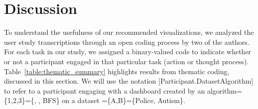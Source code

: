 \section{Discussion}
To understand the usefulness of our recommended visualizations, we analyzed the user study transcriptions through an open coding process by two of the authors. For each task in our study, we assigned a binary-valued code to indicate whether or not a participant engaged in that particular task (action or thought process). Table~\ref{table:thematic_summary} highlights results from thematic coding, discussed in this section. We will use the notation [Participant.DatasetAlgorithm] to refer to a participant engaging with a dashboard created by an algorithm=\{1,2,3\}=\{\system, \cluster, \textsc{BFS}\} on a dataset =\{A,B\}=\{Police, Autism\}.
